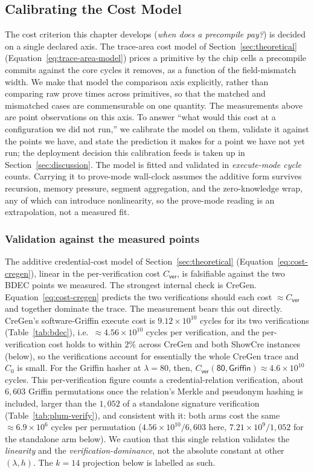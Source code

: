 \subsection{Calibrating the Cost Model}\label{ssec:costmodel}
The cost criterion this chapter develops (\emph{when does a precompile pay?}) is decided on a single declared axis. The trace-area cost model of Section~\ref{sec:theoretical} (Equation~\eqref{eq:trace-area-model}) prices a primitive by the chip cells a precompile commits against the core cycles it removes, as a function of the field-mismatch width. We make that model the comparison axis explicitly, rather than comparing raw prove times across primitives, so that the matched and mismatched cases are commensurable on one quantity. The measurements above are point observations on this axis. To answer ``what would this cost at a configuration we did not run,'' we calibrate the model on them, validate it against the points we have, and state the prediction it makes for a point we have not yet run; the deployment decision this calibration feeds is taken up in Section~\ref{sec:discussion}. The model is fitted and validated in \emph{execute-mode cycle} counts. Carrying it to prove-mode wall-clock assumes the additive form survives recursion, memory pressure, segment aggregation, and the zero-knowledge wrap, any of which can introduce nonlinearity, so the prove-mode reading is an extrapolation, not a measured fit.

\subsubsection{Validation against the measured points}
The additive credential-cost model of Section~\ref{sec:theoretical} (Equation~\eqref{eq:cost-cregen}), linear in the per-verification cost $C_{\mathsf{ver}}$, is falsifiable against the two BDEC points we measured. The strongest internal check is CreGen. Equation~\eqref{eq:cost-cregen} predicts the two verifications should each cost $\approx C_{\mathsf{ver}}$ and together dominate the trace. The measurement bears this out directly. CreGen's software-Griffin execute cost is $9.12\times10^{10}$ cycles for its two verifications (Table~\ref{tab:bdec}), i.e.\ $\approx4.56\times10^{10}$ cycles per verification, and the per-verification cost holds to within $2\%$ across CreGen and both ShowCre instances (below), so the verifications account for essentially the whole CreGen trace and $C_0$ is small. For the Griffin hasher at $\lambda=80$, then, $C_{\mathsf{ver}}(\textsf{80},\textsf{Griffin})\approx 4.6\times10^{10}$ cycles. This per-verification figure counts a credential-relation verification, about $6{,}603$ Griffin permutations once the relation's Merkle and pseudonym hashing is included, larger than the $1{,}052$ of a standalone signature verification (Table~\ref{tab:plum-verify}), and consistent with it: both arms cost the same ${\approx}6.9\times10^{6}$ cycles per permutation ($4.56\times10^{10}/6{,}603$ here, $7.21\times10^{9}/1{,}052$ for the standalone arm below). We caution that this single relation validates the \emph{linearity} and the \emph{verification-dominance}, not the absolute constant at other $(\lambda,h)$. The $k=14$ projection below is labelled as such.

